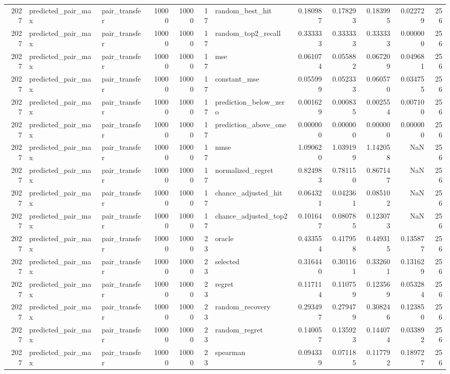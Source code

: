 \begin{tabular}{rllrrrlrrrrr}
2027 & predicted_pair_max & pair_transfer & 10000 & 10000 & 17 & random_best_hit & 0.180987 & 0.178293 & 0.183995 & 0.022729 & 256 \\
2027 & predicted_pair_max & pair_transfer & 10000 & 10000 & 17 & random_top2_recall & 0.333333 & 0.333333 & 0.333333 & 0.000000 & 256 \\
2027 & predicted_pair_max & pair_transfer & 10000 & 10000 & 17 & mse & 0.061074 & 0.055882 & 0.067209 & 0.049681 & 256 \\
2027 & predicted_pair_max & pair_transfer & 10000 & 10000 & 17 & constant_mse & 0.055999 & 0.052333 & 0.060570 & 0.034755 & 256 \\
2027 & predicted_pair_max & pair_transfer & 10000 & 10000 & 17 & prediction_below_zero & 0.001629 & 0.000835 & 0.002554 & 0.007100 & 256 \\
2027 & predicted_pair_max & pair_transfer & 10000 & 10000 & 17 & prediction_above_one & 0.000000 & 0.000000 & 0.000000 & 0.000000 & 256 \\
2027 & predicted_pair_max & pair_transfer & 10000 & 10000 & 17 & nmse & 1.090620 & 1.039199 & 1.142058 & NaN & 256 \\
2027 & predicted_pair_max & pair_transfer & 10000 & 10000 & 17 & normalized_regret & 0.824983 & 0.781150 & 0.867147 & NaN & 256 \\
2027 & predicted_pair_max & pair_transfer & 10000 & 10000 & 17 & chance_adjusted_hit & 0.064321 & 0.042361 & 0.085102 & NaN & 256 \\
2027 & predicted_pair_max & pair_transfer & 10000 & 10000 & 17 & chance_adjusted_top2 & 0.101647 & 0.080785 & 0.123073 & NaN & 256 \\
2027 & predicted_pair_max & pair_transfer & 10000 & 10000 & 23 & oracle & 0.433554 & 0.417958 & 0.449315 & 0.135877 & 256 \\
2027 & predicted_pair_max & pair_transfer & 10000 & 10000 & 23 & selected & 0.316440 & 0.301161 & 0.332601 & 0.131629 & 256 \\
2027 & predicted_pair_max & pair_transfer & 10000 & 10000 & 23 & regret & 0.117114 & 0.110759 & 0.123569 & 0.053284 & 256 \\
2027 & predicted_pair_max & pair_transfer & 10000 & 10000 & 23 & random_recovery & 0.293497 & 0.279479 & 0.308246 & 0.123850 & 256 \\
2027 & predicted_pair_max & pair_transfer & 10000 & 10000 & 23 & random_regret & 0.140057 & 0.135923 & 0.144074 & 0.033892 & 256 \\
2027 & predicted_pair_max & pair_transfer & 10000 & 10000 & 23 & spearman & 0.094339 & 0.071185 & 0.117792 & 0.189727 & 256 \\

\end{tabular}
